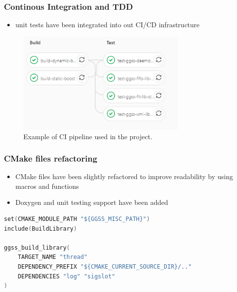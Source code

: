 \documentclass[10pt]{beamer}
\begin{document}
\begin{frame}[fragile]
\frametitle{Continous Integration and TDD}
\begin{itemize}
\item unit tests have been integrated into out CI/CD infrastructure
\end{itemize}
\begin{figure}
\centering
\includegraphics[width=0.75\textwidth]{resources/pipeline_example.png}
\caption{Example of CI pipeline used in the project.}
\end{figure}
\end{frame}


\begin{frame}[fragile]
\frametitle{CMake files refactoring}
\begin{itemize}
\item CMake files have been slightly refactored to improve readability by using macros and functions
\item Doxygen and unit testing support have been added
\end{itemize}
\begin{lstlisting}[language=c++, caption={New version of CMake used for building \emph{thread-lib}}]
set(CMAKE_MODULE_PATH "${GGSS_MISC_PATH}")
include(BuildLibrary)

ggss_build_library(
    TARGET_NAME "thread"
    DEPENDENCY_PREFIX "${CMAKE_CURRENT_SOURCE_DIR}/.."
    DEPENDENCIES "log" "sigslot"
)
\end{lstlisting}
\end{frame}
\end{document}
